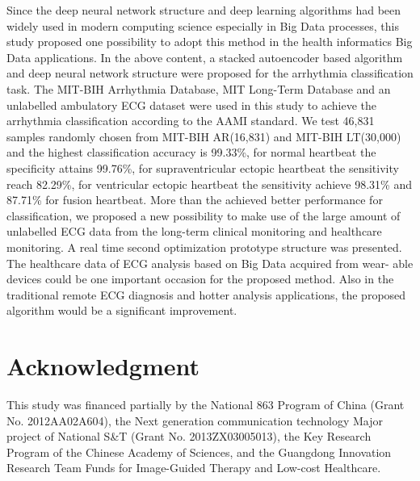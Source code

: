 \documentclass[journal]{IEEEtran}
\begin{document}
Since the deep neural network structure and deep learning algorithms had been widely used in modern computing science especially in Big Data processes, this study proposed one possibility to adopt this method in the health informatics Big Data applications. In the above content, a stacked autoencoder based algorithm and deep neural network structure were proposed for the arrhythmia classification task. The MIT-BIH Arrhythmia Database, MIT Long-Term Database and an unlabelled ambulatory ECG dataset were used in this study to achieve the arrhythmia classification according to the AAMI standard. We test 46,831 samples randomly chosen from MIT-BIH AR(16,831) and MIT-BIH LT(30,000) and the highest classification accuracy is 99.33\%, for normal heartbeat the specificity attains 99.76\%, for supraventricular ectopic heartbeat the sensitivity reach 82.29\%, for ventricular ectopic heartbeat the sensitivity achieve 98.31\% and 87.71\% for fusion heartbeat.
More than the achieved better performance for classification, we proposed a new possibility to make use of the large amount of unlabelled ECG data from the long-term clinical monitoring and healthcare monitoring. A real time second optimization prototype structure was presented. The healthcare data of ECG analysis based on Big Data acquired from wear- able devices could be one important occasion for the proposed method. Also in the traditional remote ECG diagnosis and hotter analysis applications, the proposed algorithm would be a significant improvement.


\section*{Acknowledgment}
This study was financed partially by the National 863 Program of China (Grant No. 2012AA02A604), the Next generation communication technology Major project of National S\&T (Grant No. 2013ZX03005013), the Key Research Program of the Chinese Academy of Sciences, and the Guangdong Innovation Research Team Funds for Image-Guided Therapy and Low-cost Healthcare. 
\ifCLASSOPTIONcaptionsoff
  \newpage
\fi

\end{document}
